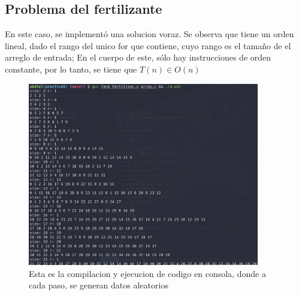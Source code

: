 \documentclass{article}
\begin{document}
    \subsection{Problema del fertilizante}
    En este caso, se implementó una solucion voraz. Se observa que tiene un orden lineal, dado el rango del unico for que contiene, cuyo rango es el tamaño de el arreglo de entrada; En el cuerpo de este, sólo hay instrucciones de orden constante, por lo tanto, se tiene que $T(n) \in O(n)$
    \begin{figure}[h!]
        \centering
        \includegraphics[width=0.9\textwidth]{greedy_console_out.jpeg}
        \caption{Esta es la compilacion y ejecucion de codigo en consola, donde a cada paso, se generan datos aleatorios}
        \label{fig:my_label}
    \end{figure}
    \newpage
\end{document}
